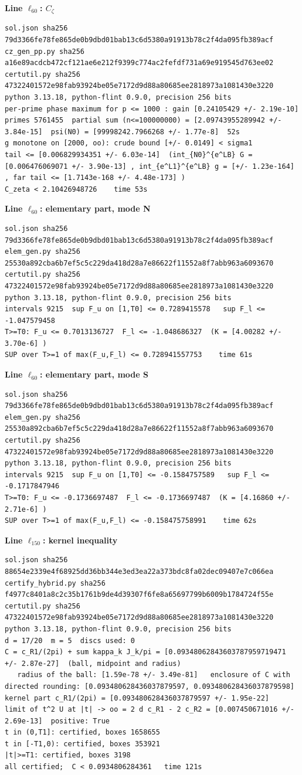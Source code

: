 \documentclass[11pt,reqno]{amsart}
\numberwithin{equation}{section}
\theoremstyle{definition}
\theoremstyle{remark}
\newcommand{\appsub}[1]{\par\medskip\noindent\textbf{#1}\par\nobreak\smallskip}
\begin{document}
\appsub{Line $\ell_{60}$: $C_\zeta$}
\begin{lstlisting}
sol.json sha256 79d3366fe78fe865de0b9dbd01bab13c6d5380a91913b78c2f4da095fb389acf
cz_gen_pp.py sha256 a16e89acdcb472cf121ae6e212f9399c774ac2fefdf731a69e919545d763ee02
certutil.py sha256 47322401572e98fab93924be05e7172d9d88a80685ee2818973a1081430e3220
python 3.13.18, python-flint 0.9.0, precision 256 bits
per-prime phase maximum for p <= 1000 : gain [0.24105429 +/- 2.19e-10]
primes 5761455  partial sum (n<=100000000) = [2.09743955289942 +/- 3.84e-15]  psi(N0) = [99998242.7966268 +/- 1.77e-8]  52s
g monotone on [2000, oo): crude bound [+/- 0.0149] < sigma1
tail <= [0.006829934351 +/- 6.03e-14]  (int_{N0}^{e^LB} G = [0.006476069071 +/- 3.90e-13] , int_{e^L1}^{e^LB} g = [+/- 1.23e-164] , far tail <= [1.7143e-168 +/- 4.48e-173] )
C_zeta < 2.10426948726    time 53s
\end{lstlisting}
\appsub{Line $\ell_{60}$: elementary part, mode N}
\begin{lstlisting}
sol.json sha256 79d3366fe78fe865de0b9dbd01bab13c6d5380a91913b78c2f4da095fb389acf
elem_gen.py sha256 25530a892cba6b7ef5c5c229da418d28a7e86622f11552a8f7abb963a6093670
certutil.py sha256 47322401572e98fab93924be05e7172d9d88a80685ee2818973a1081430e3220
python 3.13.18, python-flint 0.9.0, precision 256 bits
intervals 9215  sup F_u on [1,T0] <= 0.7289415578   sup F_l <= -1.047579458
T>=T0: F_u <= 0.7013136727  F_l <= -1.048686327  (K = [4.00282 +/- 3.70e-6] )
SUP over T>=1 of max(F_u,F_l) <= 0.728941557753    time 61s
\end{lstlisting}
\appsub{Line $\ell_{60}$: elementary part, mode S}
\begin{lstlisting}
sol.json sha256 79d3366fe78fe865de0b9dbd01bab13c6d5380a91913b78c2f4da095fb389acf
elem_gen.py sha256 25530a892cba6b7ef5c5c229da418d28a7e86622f11552a8f7abb963a6093670
certutil.py sha256 47322401572e98fab93924be05e7172d9d88a80685ee2818973a1081430e3220
python 3.13.18, python-flint 0.9.0, precision 256 bits
intervals 9215  sup F_u on [1,T0] <= -0.1584757589   sup F_l <= -0.1717847946
T>=T0: F_u <= -0.1736697487  F_l <= -0.1736697487  (K = [4.16860 +/- 2.71e-6] )
SUP over T>=1 of max(F_u,F_l) <= -0.158475758991    time 62s
\end{lstlisting}
\appsub{Line $\ell_{150}$: kernel inequality}
\begin{lstlisting}
sol.json sha256 88654e2339e4f68925dd36bb344e3ed3ea22a373bdc8fa02dec09407e7c066ea
certify_hybrid.py sha256 f4977c8401a8c2c35b1761b9de4d39307f6fe8a65697799b6009b1784724f55e
certutil.py sha256 47322401572e98fab93924be05e7172d9d88a80685ee2818973a1081430e3220
python 3.13.18, python-flint 0.9.0, precision 256 bits
d = 17/20  m = 5  discs used: 0 
C = c_R1/(2pi) + sum kappa_k J_k/pi = [0.09348062843603787959719471 +/- 2.87e-27]  (ball, midpoint and radius)
   radius of the ball: [1.59e-78 +/- 3.49e-81]   enclosure of C with directed rounding: [0.093480628436037879597, 0.093480628436037879598]
kernel part c_R1/(2pi) = [0.093480628436037879597 +/- 1.95e-22]
limit of t^2 U at |t| -> oo = 2 d c_R1 - 2 c_R2 = [0.007450671016 +/- 2.69e-13]  positive: True
t in (0,T1]: certified, boxes 1658655
t in [-T1,0): certified, boxes 353921
|t|>=T1: certified, boxes 3198
all certified;  C < 0.0934806284361   time 121s
\end{lstlisting}
\end{document}
